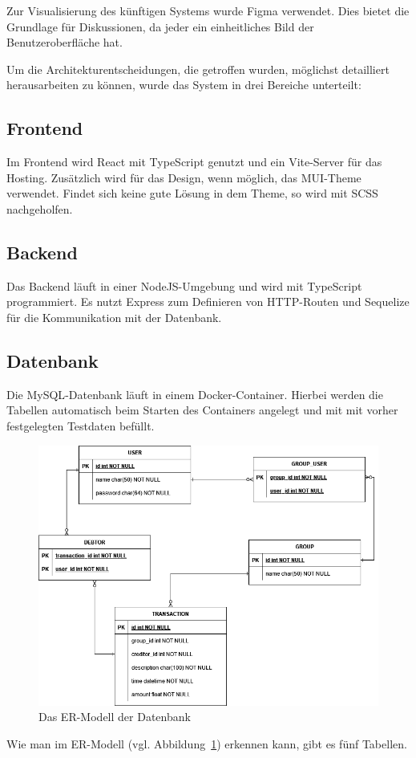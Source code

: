 \documentclass[conference]{IEEEtran}
\begin{document}
Zur Visualisierung des künftigen Systems wurde \gls{Figma} verwendet. Dies bietet die Grundlage für Diskussionen, da jeder ein einheitliches Bild der Benutzeroberfläche hat.

Um die Architekturentscheidungen, die getroffen wurden, möglichst detailliert herausarbeiten zu können, wurde
das System in drei Bereiche unterteilt:
\subsection{Frontend}
Im \gls{Frontend} wird \gls{React} mit \gls{TypeScript} genutzt und ein \gls{Vite}-Server für das Hosting. Zusätzlich wird für das Design, wenn möglich, das \gls{MUI}-Theme verwendet.
Findet sich keine gute Lösung in dem Theme, so wird mit \gls{SCSS} nachgeholfen.
\subsection{Backend}
Das \gls{Backend} läuft in einer \gls{NodeJS}-Umgebung und wird mit TypeScript programmiert. Es nutzt \gls{Express} zum Definieren von \gls{HTTP}-Routen und \gls{Sequelize} für die Kommunikation mit der Datenbank.
\subsection{Datenbank}
Die \gls{MySQL}-Datenbank läuft in einem \gls{Docker}-Container. Hierbei werden die Tabellen automatisch beim Starten des Containers angelegt und mit mit vorher festgelegten Testdaten befüllt.
\begin{figure}[h]
    \centering
    \includegraphics[width=\linewidth]{ER_Modell.png}
    \caption[Das ER-Modell der Datenbank]
    {Das ER-Modell der Datenbank}
    \label{fig:erModell}
\end{figure}
Wie man im \gls{ER-Modell} (vgl. Abbildung~\ref{fig:erModell}) erkennen kann, gibt es fünf Tabellen.
\end{document}
